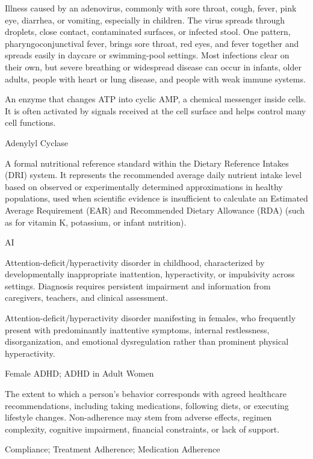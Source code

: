  Illness caused by an adenovirus, commonly with sore throat, cough, fever, pink eye, diarrhea, or vomiting, especially in children. The virus spreads through droplets, close contact, contaminated surfaces, or infected stool. One pattern, pharyngoconjunctival fever, brings sore throat, red eyes, and fever together and spreads easily in daycare or swimming-pool settings. Most infections clear on their own, but severe breathing or widespread disease can occur in infants, older adults, people with heart or lung disease, and people with weak immune systems.

 An enzyme that changes ATP into cyclic AMP, a chemical messenger inside cells. It is often activated by signals received at the cell surface and helps control many cell functions.

\synonyms
Adenylyl Cyclase

 A formal nutritional reference standard within the Dietary Reference Intakes (DRI) system. It represents the recommended average daily nutrient intake level based on observed or experimentally determined approximations in healthy populations, used when scientific evidence is insufficient to calculate an Estimated Average Requirement (EAR) and Recommended Dietary Allowance (RDA) (such as for vitamin K, potassium, or infant nutrition).

\synonyms
AI

 Attention-deficit/hyperactivity disorder in childhood, characterized by developmentally inappropriate inattention, hyperactivity, or impulsivity across settings. Diagnosis requires persistent impairment and information from caregivers, teachers, and clinical assessment.

 Attention-deficit/hyperactivity disorder manifesting in females, who frequently present with predominantly inattentive symptoms, internal restlessness, disorganization, and emotional dysregulation rather than prominent physical hyperactivity.

\synonyms
Female ADHD; ADHD in Adult Women

 The extent to which a person's behavior corresponds with agreed healthcare recommendations, including taking medications, following diets, or executing lifestyle changes. Non-adherence may stem from adverse effects, regimen complexity, cognitive impairment, financial constraints, or lack of support.

\synonyms
Compliance; Treatment Adherence; Medication Adherence

